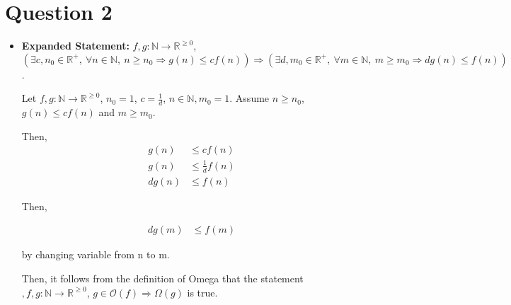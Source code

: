 \documentclass[12pt]{article}
\begin{document}
\section*{Question 2}
\begin{itemize}
    \item

    \textbf{Expanded Statement:} $f,g:\mathbb{N} \to \mathbb{R}^{\geq 0}$,
    $(\exists c,n_0 \in \mathbb{R}^{+},\:\forall n \in \mathbb{N},\:n \geq n_0
    \Rightarrow g(n) \leq cf(n)) \Rightarrow (\exists d,m_0 \in \mathbb{R}^{+},\:
    \forall m \in \mathbb{N},\: m \geq m_0 \Rightarrow dg(n) \leq f(n))$.

    \bigskip

    Let $f,g: \mathbb{N} \to \mathbb{R}^{\geq 0}$, $n_0 = 1$, $c = \frac{1}{d}$,
    $n \in \mathbb{N}, m_0 = 1$. Assume $n \geq n_0$, $g(n) \leq cf(n)$ and
    $m \geq m_0$.

    \bigskip

    Then,
    \setcounter{equation}{0}
    \begin{align}
        g(n) &\leq cf(n)\\
        g(n) &\leq \frac{1}{d}f(n)\\
        dg(n) &\leq f(n)
    \end{align}

    \bigskip

    Then,

    \begin{align}
        dg(m) &\leq f(m)
    \end{align}

    by changing variable from n to m.

    \bigskip

    Then, it follows from the definition of Omega that the statement
    $,f,g: \mathbb{N} \to \mathbb{R}^{\geq 0}$, $g \in \mathcal{O}(f) \Rightarrow
    \Omega (g)$ is true.

\end{itemize}
\end{document}
